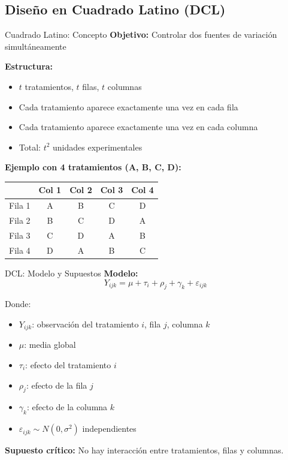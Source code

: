 \documentclass[aspectratio=169]{beamer}
\begin{document}
\subsection{Diseño en Cuadrado Latino (DCL)}

\begin{frame}{Cuadrado Latino: Concepto}
\textbf{Objetivo:} Controlar dos fuentes de variación simultáneamente

\vspace{0.3cm}
\textbf{Estructura:}
\begin{itemize}
\item $t$ tratamientos, $t$ filas, $t$ columnas
\item Cada tratamiento aparece exactamente una vez en cada fila
\item Cada tratamiento aparece exactamente una vez en cada columna
\item Total: $t^2$ unidades experimentales
\end{itemize}

\vspace{0.3cm}
\textbf{Ejemplo con 4 tratamientos (A, B, C, D):}
\begin{table}
\centering
\begin{tabular}{c|cccc}
& Col 1 & Col 2 & Col 3 & Col 4 \\
\hline
Fila 1 & A & B & C & D \\
Fila 2 & B & C & D & A \\
Fila 3 & C & D & A & B \\
Fila 4 & D & A & B & C \\
\end{tabular}
\end{table}
\end{frame}

\begin{frame}{DCL: Modelo y Supuestos}
\textbf{Modelo:}
$$Y_{ijk} = \mu + \tau_i + \rho_j + \gamma_k + \varepsilon_{ijk}$$

Donde:
\begin{itemize}
\item $Y_{ijk}$: observación del tratamiento $i$, fila $j$, columna $k$
\item $\mu$: media global
\item $\tau_i$: efecto del tratamiento $i$
\item $\rho_j$: efecto de la fila $j$
\item $\gamma_k$: efecto de la columna $k$
\item $\varepsilon_{ijk} \sim N(0,\sigma^2)$ independientes
\end{itemize}

\vspace{0.3cm}
\textbf{Supuesto crítico:} No hay interacción entre tratamientos, filas y columnas.
\end{frame}
\end{document}
